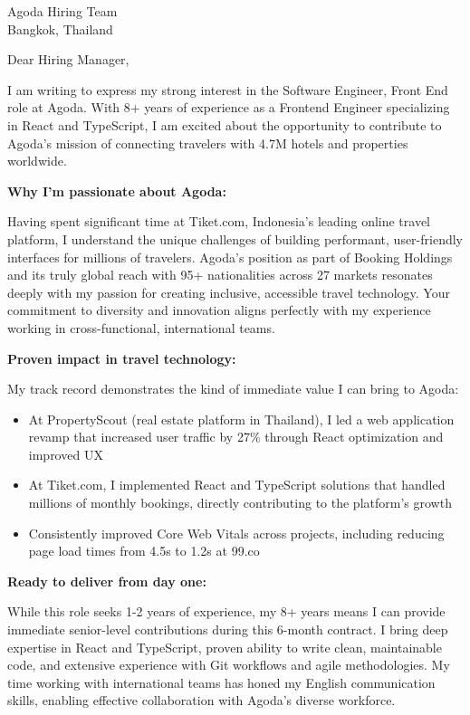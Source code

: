\documentclass[11pt,a4paper]{letter}
\begin{document}
\begin{letter}{Agoda Hiring Team \\ Bangkok, Thailand}

\opening{Dear Hiring Manager,}

I am writing to express my strong interest in the Software Engineer, Front End role at Agoda. With 8+ years of experience as a Frontend Engineer specializing in React and TypeScript, I am excited about the opportunity to contribute to Agoda's mission of connecting travelers with 4.7M hotels and properties worldwide.

\textbf{Why I'm passionate about Agoda:}

Having spent significant time at Tiket.com, Indonesia's leading online travel platform, I understand the unique challenges of building performant, user-friendly interfaces for millions of travelers. Agoda's position as part of Booking Holdings and its truly global reach with 95+ nationalities across 27 markets resonates deeply with my passion for creating inclusive, accessible travel technology. Your commitment to diversity and innovation aligns perfectly with my experience working in cross-functional, international teams.

\textbf{Proven impact in travel technology:}

My track record demonstrates the kind of immediate value I can bring to Agoda:
\begin{itemize}
    \item At PropertyScout (real estate platform in Thailand), I led a web application revamp that increased user traffic by 27\% through React optimization and improved UX
    \item At Tiket.com, I implemented React and TypeScript solutions that handled millions of monthly bookings, directly contributing to the platform's growth
    \item Consistently improved Core Web Vitals across projects, including reducing page load times from 4.5s to 1.2s at 99.co
\end{itemize}

\textbf{Ready to deliver from day one:}

While this role seeks 1-2 years of experience, my 8+ years means I can provide immediate senior-level contributions during this 6-month contract. I bring deep expertise in React and TypeScript, proven ability to write clean, maintainable code, and extensive experience with Git workflows and agile methodologies. My time working with international teams has honed my English communication skills, enabling effective collaboration with Agoda's diverse workforce.


\end{letter}
\end{document}
